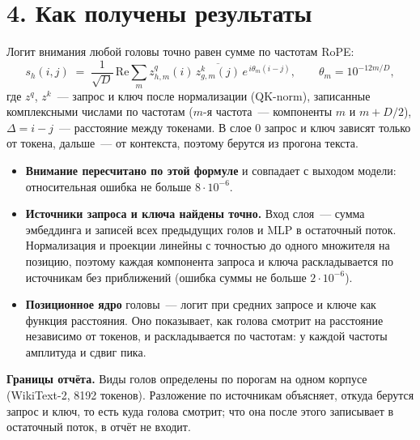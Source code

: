 \documentclass[10pt]{article}
\begin{document}
\section*{4. Как получены результаты}
Логит внимания любой головы точно равен сумме по частотам RoPE:
\[ s_h(i,j) \;=\; \frac{1}{\sqrt{D}}\,\mathrm{Re}\sum_{m} z^{q}_{h,m}(i)\,\overline{z^{k}_{g,m}(j)}\,e^{\,i\theta_m (i-j)}, \qquad \theta_m = 10^{-12m/D}, \]
где $z^q$, $z^k$~— запрос и ключ после нормализации (QK-norm), записанные комплексными числами по частотам ($m$-я частота~— компоненты $m$ и $m+D/2$), $\Delta=i-j$~— расстояние между токенами. В слое 0 запрос и ключ зависят только от токена, дальше~— от контекста, поэтому берутся из прогона текста.
\begin{itemize}
\item \textbf{Внимание пересчитано по этой формуле} и совпадает с выходом модели: относительная ошибка не больше $8\cdot 10^{-6}$.
\item \textbf{Источники запроса и ключа найдены точно.} Вход слоя~— сумма эмбеддинга и записей всех предыдущих голов и MLP в остаточный поток. Нормализация и проекции линейны с точностью до одного множителя на позицию, поэтому каждая компонента запроса и ключа раскладывается по источникам без приближений (ошибка суммы не больше $2\cdot 10^{-6}$).
\item \textbf{Позиционное ядро} головы~— логит при средних запросе и ключе как функция расстояния. Оно показывает, как голова смотрит на расстояние независимо от токенов, и раскладывается по частотам: у каждой частоты амплитуда и сдвиг пика.
\end{itemize}
\textbf{Границы отчёта.} Виды голов определены по порогам на одном корпусе (WikiText-2, 8192 токенов). Разложение по источникам объясняет, откуда берутся запрос и ключ, то есть куда голова смотрит; что она после этого записывает в остаточный поток, в отчёт не входит.
\end{document}
